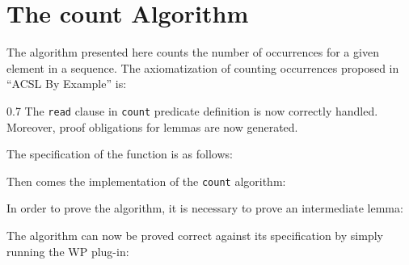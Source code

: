\section{The \textsf{count} Algorithm}
\label{count}

The algorithm presented here counts the number of occurrences for a
given element in a sequence. The axiomatization of counting
occurrences proposed in ``ACSL By Example'' is:


\begin{feature}{0.7}
The \texttt{read} clause in \texttt{count} predicate definition is now
correctly handled. Moreover, proof obligations for lemmas are now generated.
\end{feature}

The specification of the function is as follows:


Then comes the implementation of the \texttt{count} algorithm:


In order to prove the algorithm, it is necessary to prove an
intermediate lemma:


The algorithm can now be proved correct against its specification by
simply running the \textsf{WP} plug-in: 

